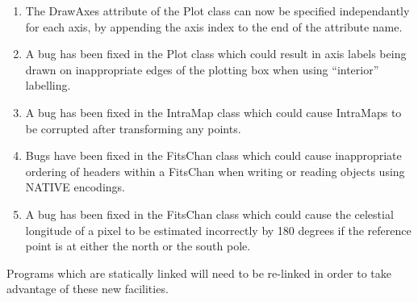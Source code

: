 \documentclass[twoside,11pt]{article}
\newcommand{\htmlref}[2]{#1}
\begin{document}
\begin{enumerate}
\item The DrawAxes attribute of the Plot class can now be specified
independantly for each axis, by appending the axis index to the
end of the attribute name.

\item A bug has been fixed in the Plot class which could result in axis
labels being drawn on inappropriate edges of the plotting box when using
``interior'' labelling.

\item A bug has been fixed in the \htmlref{IntraMap}{IntraMap} class which could cause IntraMaps
to be corrupted after transforming any points.

\item Bugs have been fixed in the \htmlref{FitsChan}{FitsChan} class which could cause
inappropriate ordering of headers within a FitsChan when writing or
reading objects using NATIVE encodings.  

\item A bug has been fixed in the FitsChan class which could cause the
celestial longitude of a pixel to be estimated incorrectly by 180 degrees
if the reference point is at either the north or the south pole. 

\end{enumerate}

Programs which are statically linked will need to be re-linked in
order to take advantage of these new facilities.
\end{document}
